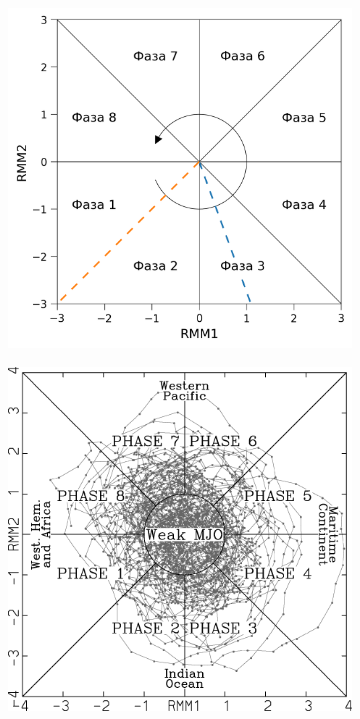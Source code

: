 \begin{figure}
    \centering  
    \begin{subfigure}[tb]{.45\textwidth}
		\includegraphics[width=\textwidth]{figures/rmm_diagram.png}
		\caption{}
		\label{fig:rmm_diagram}
	\end{subfigure}
	\hfill
	\begin{subfigure}[tb]{.45\textwidth}
		\includegraphics[width=\textwidth]{figures/wh04_fig7.png}

\end{subfigure}
\end{figure}
